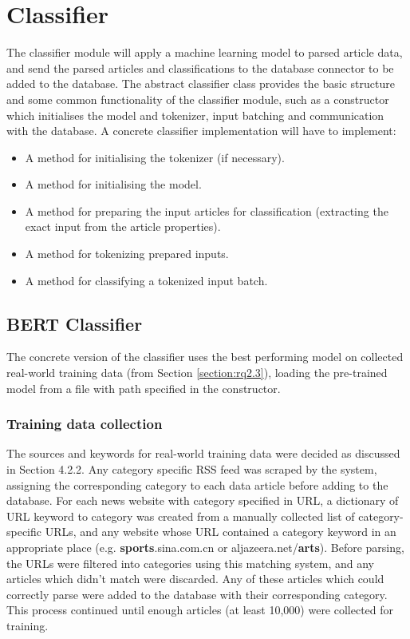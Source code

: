 \documentclass{l4proj}
\begin{document}
\section{Classifier}
The classifier module will apply a machine learning model to parsed article data, and send the parsed articles and classifications to the database connector to be added to the database. The abstract classifier class provides the basic structure and some common functionality of the classifier module, such as a constructor which initialises the model and tokenizer, input batching and communication with the database. A concrete classifier implementation will have to implement:
\begin{itemize}
    \item A method for initialising the tokenizer (if necessary).
    \item A method for initialising the model.
    \item A method for preparing the input articles for classification (extracting the exact input from the article properties).
    \item A method for tokenizing prepared inputs.
    \item A method for classifying a tokenized input batch.
\end{itemize}

\subsection{BERT Classifier}
The concrete version of the classifier uses the best performing model on collected real-world training data (from Section \ref{section:rq2.3}), loading the pre-trained model from a file with path specified in the constructor. 
\subsubsection{Training data collection} \hfill \par
The sources and keywords for real-world training data were decided as discussed in Section 4.2.2. Any category specific RSS feed was scraped by the system, assigning the corresponding category to each data article before adding to the database. For each news website with category specified in URL, a dictionary of URL keyword to category was created from a manually collected list of category-specific URLs, and any website whose URL contained a category keyword in an appropriate place (e.g. \textbf{sports}.sina.com.cn or aljazeera.net/\textbf{arts}). Before parsing, the URLs were filtered into categories using this matching system, and any articles which didn't match were discarded. Any of these articles which could correctly parse were added to the database with their corresponding category. This process continued until enough articles (at least 10,000) were collected for training.
\end{document}
